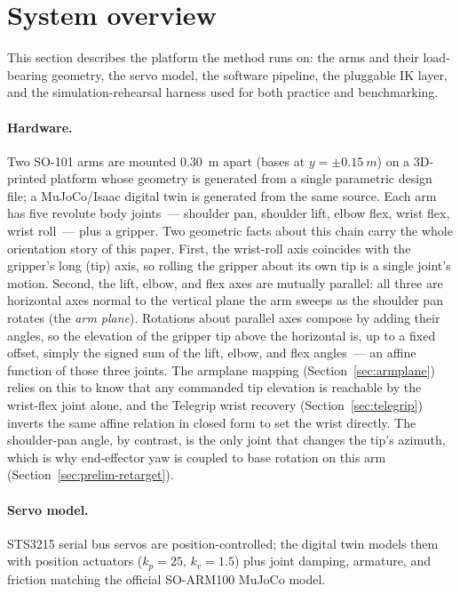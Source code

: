\section{System overview}
\label{sec:system}

This section describes the platform the method runs on: the arms and
their load-bearing geometry, the servo model, the software pipeline, the
pluggable IK layer, and the simulation-rehearsal harness used for both
practice and benchmarking.

\paragraph{Hardware.}
Two SO-101 arms are mounted \SI{0.30}{m} apart (bases at
\(y=\pm\SI{0.15}{m}\)) on a 3D-printed platform whose geometry is
generated from a single parametric design file; a MuJoCo/Isaac digital
twin is generated from the same source. Each arm has five revolute body
joints~--- shoulder pan, shoulder lift, elbow flex, wrist flex, wrist
roll~--- plus a gripper. Two geometric facts about this chain carry the
whole orientation story of this paper. First, the wrist-roll axis
coincides with the gripper's long (tip) axis, so rolling the gripper
about its own tip is a single joint's motion. Second, the lift, elbow,
and flex axes are mutually parallel: all three are horizontal axes
normal to the vertical plane the arm sweeps as the shoulder pan rotates
(the \emph{arm plane}). Rotations about parallel axes compose by adding
their angles, so the elevation of the gripper tip above the horizontal
is, up to a fixed offset, simply the signed sum of the lift, elbow, and
flex angles~--- an affine function of those three joints. The armplane
mapping (Section~\ref{sec:armplane}) relies on this to know that any
commanded tip elevation is reachable by the wrist-flex joint alone, and
the Telegrip wrist recovery (Section~\ref{sec:telegrip}) inverts the
same affine relation in closed form to set the wrist directly. The
shoulder-pan angle, by contrast, is the only joint that changes the
tip's azimuth, which is why end-effector yaw is coupled to base rotation
on this arm (Section~\ref{sec:prelim-retarget}).

\paragraph{Servo model.}
STS3215 serial bus servos are position-controlled; the digital twin
models them with position actuators (\(k_p=25\), \(k_v=1.5\)) plus joint
damping, armature, and friction matching the official SO-ARM100 MuJoCo
model.


